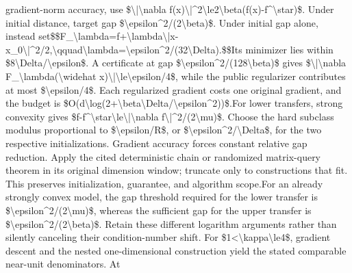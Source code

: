 \documentclass[10pt,a4paper]{article}
\begin{document}
gradient-norm accuracy,\allowbreak{} use \$\textbackslash{}|\textbackslash{}nabla f(x)\textbackslash{}|\textasciicircum{}2\textbackslash{}le2\textbackslash{}beta(f(x)-f\textasciicircum{}\textbackslash{}star)\$. Under initial distance,\allowbreak{} target gap \$\textbackslash{}epsilon\textasciicircum{}2/\allowbreak{}(2\textbackslash{}beta)\$. Under initial gap alone,\allowbreak{} instead set\newline{}\$\$\newline{}F\_\allowbreak{}\textbackslash{}lambda=\allowbreak{}f+\textbackslash{}lambda\textbackslash{}|x-x\_\allowbreak{}0\textbackslash{}|\textasciicircum{}2/\allowbreak{}2,\allowbreak{}\textbackslash{}qquad\textbackslash{}lambda=\allowbreak{}\textbackslash{}epsilon\textasciicircum{}2/\allowbreak{}(32\textbackslash{}Delta).\newline{}\$\$\newline{}Its minimizer lies within \$8\textbackslash{}Delta/\allowbreak{}\textbackslash{}epsilon\$. A certificate at gap \$\textbackslash{}epsilon\textasciicircum{}2/\allowbreak{}(128\textbackslash{}beta)\$ gives \$\textbackslash{}|\textbackslash{}nabla F\_\allowbreak{}\textbackslash{}lambda(\textbackslash{}widehat x)\textbackslash{}|\textbackslash{}le\textbackslash{}epsilon/\allowbreak{}4\$,\allowbreak{} while the public regularizer contributes at most \$\textbackslash{}epsilon/\allowbreak{}4\$. Each regularized gradient costs one original gradient,\allowbreak{} and the budget is \$O(d\textbackslash{}log(2+\textbackslash{}beta\textbackslash{}Delta/\allowbreak{}\textbackslash{}epsilon\textasciicircum{}2))\$.\newline{}\newline{}For lower transfers,\allowbreak{} strong convexity gives \$f-f\textasciicircum{}\textbackslash{}star\textbackslash{}le\textbackslash{}|\textbackslash{}nabla f\textbackslash{}|\textasciicircum{}2/\allowbreak{}(2\textbackslash{}mu)\$. Choose the hard subclass modulus proportional to \$\textbackslash{}epsilon/\allowbreak{}R\$,\allowbreak{} or \$\textbackslash{}epsilon\textasciicircum{}2/\allowbreak{}\textbackslash{}Delta\$,\allowbreak{} for the two respective initializations. Gradient accuracy forces constant relative gap reduction. Apply the cited deterministic chain or randomized matrix-query theorem in its original dimension window;\allowbreak{} truncate only to constructions that fit. This preserves initialization,\allowbreak{} guarantee,\allowbreak{} and algorithm scope.\newline{}\newline{}For an already strongly convex model,\allowbreak{} the gap threshold required for the lower transfer is \$\textbackslash{}epsilon\textasciicircum{}2/\allowbreak{}(2\textbackslash{}mu)\$,\allowbreak{} whereas the sufficient gap for the upper transfer is \$\textbackslash{}epsilon\textasciicircum{}2/\allowbreak{}(2\textbackslash{}beta)\$. Retain these different logarithm arguments rather than silently canceling their condition-number shift. For \$1<\textbackslash{}kappa\textbackslash{}le4\$,\allowbreak{} gradient descent and the nested one-dimensional construction yield the stated comparable near-unit denominators. At 
\end{document}
